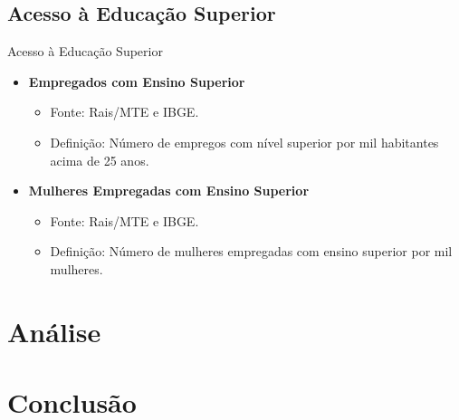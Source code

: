 \documentclass{beamer}
\begin{document}
\subsection{Acesso à Educação Superior}
\begin{frame}{Acesso à Educação Superior}
\begin{itemize}
    \item \textbf{Empregados com Ensino Superior}
    \begin{itemize}
        \item Fonte: Rais/MTE e IBGE.
        \item Definição: Número de empregos com nível superior por mil habitantes acima de 25 anos.
    \end{itemize}
    \item \textbf{Mulheres Empregadas com Ensino Superior}
    \begin{itemize}
        \item Fonte: Rais/MTE e IBGE.
        \item Definição: Número de mulheres empregadas com ensino superior por mil mulheres.
    \end{itemize}
\end{itemize}
\end{frame}

\section{Análise}

\section{Conclusão}
\end{document}
